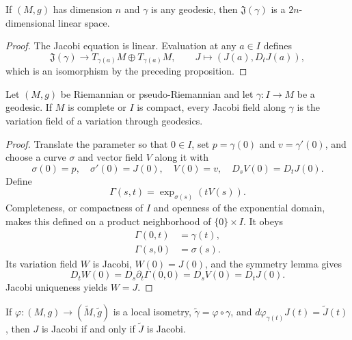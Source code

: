\begin{corollary}
\label{cor:jacobi-space-dimension}

If $(M,g)$ has dimension $n$ and $\gamma$ is any geodesic, then
$\mathfrak J(\gamma)$ is a $2n$-dimensional linear space.
\end{corollary}

\begin{proof}
\sketch
The Jacobi equation is linear.  Evaluation at any $a\in I$ defines
\[
\mathfrak J(\gamma)\longrightarrow T_{\gamma(a)}M\oplus T_{\gamma(a)}M,
\qquad
J\longmapsto(J(a),D_tJ(a)),
\]
which is an isomorphism by the preceding proposition.
\end{proof}

\begin{proposition}
\label{prop:jacobi-field-variation-field}

Let $(M,g)$ be Riemannian or pseudo-Riemannian and let $\gamma:I\to M$ be a
geodesic.  If $M$ is complete or $I$ is compact, every Jacobi field along
$\gamma$ is the variation field of a variation through geodesics.
\end{proposition}

\begin{proof}
\sketch
Translate the parameter so that $0\in I$, set $p=\gamma(0)$ and
$v=\gamma'(0)$, and choose a curve $\sigma$ and vector field $V$ along it with
\[
\sigma(0)=p,\quad \sigma'(0)=J(0),\quad
V(0)=v,\quad D_sV(0)=D_tJ(0).
\]
Define
\begin{equation}
\Gamma(s,t)=\exp_{\sigma(s)}(tV(s)). \tag{10.2}
\end{equation}
Completeness, or compactness of $I$ and openness of the exponential domain,
makes this defined on a product neighborhood of $\{0\}\times I$.  It obeys
\begin{align}
\Gamma(0,t)&=\gamma(t), \tag{10.3}\\
\Gamma(s,0)&=\sigma(s). \tag{10.4}
\end{align}
Its variation field $W$ is Jacobi, $W(0)=J(0)$, and the symmetry lemma gives
\[
D_tW(0)=D_s\partial_t\Gamma(0,0)=D_sV(0)=D_tJ(0).
\]
Jacobi uniqueness yields $W=J$.
\end{proof}

\begin{proposition}
\label{prop:local-isometry-invariance-jacobi-fields}
If $\varphi:(M,g)\to(\widetilde M,\widetilde g)$ is a local isometry,
$\widetilde\gamma=\varphi\circ\gamma$, and
$d\varphi_{\gamma(t)}J(t)=\widetilde J(t)$, then $J$ is Jacobi if and only if
$\widetilde J$ is Jacobi.
\end{proposition}

